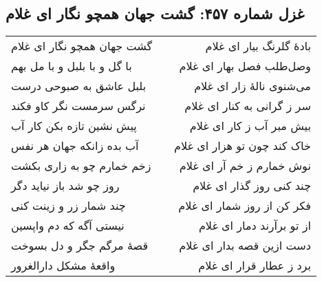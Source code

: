 \begin{center}
\section*{غزل شماره ۴۵۷: گشت جهان همچو نگار ای غلام}
\label{sec:457}
\begin{longtable}{l p{0.5cm} r}
گشت جهان همچو نگار ای غلام
&&
بادهٔ گلرنگ بیار ای غلام
\\
با گل و با بلبل و با مل بهم
&&
وصل‌طلب فصل بهار ای غلام
\\
بلبل عاشق به صبوحی درست
&&
می‌شنوی نالهٔ زار ای غلام
\\
نرگس سرمست نگر کاو فکند
&&
سر ز گرانی به کنار ای غلام
\\
پیش نشین تازه بکن کار آب
&&
بیش مبر آب ز کار ای غلام
\\
آب بده زانکه جهان هر نفس
&&
خاک کند چون تو هزار ای غلام
\\
زخم خمارم چو به زاری بکشت
&&
نوش خمارم ز خم آر ای غلام
\\
روز چو شد باز نیاید دگر
&&
چند کنی روز گذار ای غلام
\\
چند شمار زر و زینت کنی
&&
فکر کن از روز شمار ای غلام
\\
نیستی آگه که دم واپسین
&&
از تو برآرند دمار ای غلام
\\
قصهٔ مرگم جگر و دل بسوخت
&&
دست ازین قصه بدار ای غلام
\\
واقعهٔ مشکل دارالغرور
&&
برد ز عطار قرار ای غلام
\\
\end{longtable}
\end{center}
